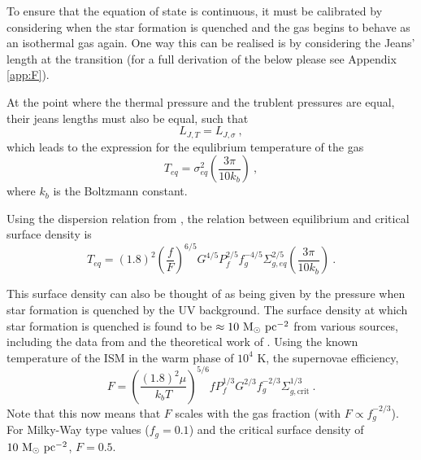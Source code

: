 To ensure that the equation of state is continuous, it must be calibrated by considering when the star formation is quenched and the gas begins to behave as an isothermal gas again.
One way this can be realised is by considering the Jeans' length at the transition (for a full derivation of the below please see Appendix \ref{app:F}).

At the point where the thermal pressure and the trublent pressures are equal, their jeans lengths must also be equal, such that
$$
     L_{J, T} = L_{J, \sigma}~,
$$
which leads to the expression for the equlibrium temperature of the gas
\begin{equation}
    T_{eq} = \sigma^2_{eq} \left(\frac{3 \pi}{10 k_b}\right)~,
    \label{eqn:teq}
\end{equation}
where $k_b$ is the Boltzmann constant.

Using the dispersion relation from \citet{martizzi2015}, the relation between equilibrium and critical surface density is
$$
  T_{eq} = (1.8)^2 \left(\frac{f}{F}\right)^{6/5} G^{4/5} P_f^{2/5} f_g^{-4/5} \Sigma_{g, eq}^{2/5} \left(\frac{3\pi}{10k_b}\right)~.
$$

This surface density can also be thought of as being given by the pressure when star formation is quenched by the UV background.
The surface density at which star formation is quenched is found to be $\approx 10 ~\mathrm{M}_{\odot} ~\mathrm{pc}^{-2}$ from various sources, including the data from \citet{bigiel2008} and the theoretical work of \citet{shcaye2005}.
Using the known temperature of the ISM in the warm phase of $10^{4}$ K, the supernovae efficiency,
\begin{equation}
    F = \left(\frac{(1.8)^2 \mu}{k_b T}\right)^{5/6} f P_f^{1/3} G^{2/3} f_g^{-2/3} \Sigma_{g, \mathrm{crit}}^{1/3}~.
    \label{eqn:Fcalib}
\end{equation}
Note that this now means that $F$ scales with the gas fraction (with $F \propto f_g^{-2/3}$).
For Milky-Way type values ($f_g = 0.1$) and the critical surface density of $10 ~\mathrm{M}_{\odot} ~\mathrm{pc}^{-2}$, $F=0.5$.
